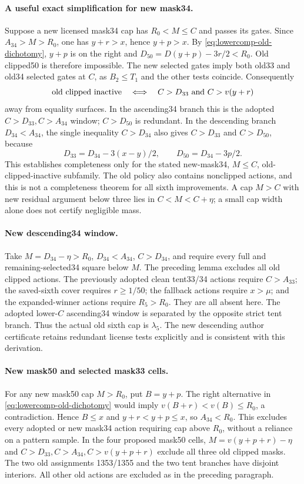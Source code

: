 \paragraph{A useful exact simplification for new mask34.}
Suppose a new licensed mask34 cap has $R_0<M\le C$ and passes its gates.
Since $A_{34}>M>R_0$, one has $y+r>x$, hence $y+p>x$.
By \eqref{eq:lowercomp-old-dichotomy}, $y+p$ is on the right and
$D_{50}=D(y+p)-3r/2<R_0$. Old clipped50 is therefore impossible.
The new selected gates imply both old33 and old34 selected gates at $C$,
as $B_2\le T_1$ and the other tests coincide. Consequently
\begin{equation}\label{eq:lowercomp-34-exact}
 \hbox{old clipped inactive}\quad\Longleftrightarrow\quad
 C>D_{33}\ \hbox{and}\ C>v(y+r)
\end{equation}
away from equality surfaces. In the ascending34 branch this is the
adopted $C>D_{33},C>A_{34}$ window; $C>D_{50}$ is redundant.
In the descending branch $D_{34}<A_{34}$, the single inequality
$C>D_{34}$ also gives $C>D_{33}$ and $C>D_{50}$, because
\[
 D_{33}=D_{34}-3(x-y)/2,\qquad D_{50}=D_{34}-3p/2.
\]
This establishes completeness only for the stated new-mask34,
$M\le C$, old-clipped-inactive subfamily. The old policy also contains
nonclipped actions, and this is not a completeness theorem for all sixth
improvements. A cap $M>C$ with new residual argument below three lies
in $C<M<C+\eta$; a small cap width alone does not certify negligible mass.

\paragraph{New descending34 window.}
Take $M=D_{34}-\eta>R_0$, $D_{34}<A_{34}$, $C>D_{34}$,
and require every full and remaining-selected34 square below $M$.
The preceding lemma excludes all old clipped actions. The previously
adopted clean tent33/34 actions require $C>A_{33}$; the saved-sixth cover
requires $r\ge1/50$; the fallback actions require $x>\mu$; and the
expanded-winner actions require $R_5>R_0$. They are all absent here.
The adopted lower-$C$ ascending34 window is separated by the opposite
strict tent branch. Thus the actual old sixth cap is $\lambda_5$.
The new descending author certificate retains redundant license tests
explicitly and is consistent with this derivation.

\paragraph{New mask50 and selected mask33 cells.}
For any new mask50 cap $M>R_0$, put $B=y+p$. The right alternative in
\eqref{eq:lowercomp-old-dichotomy} would imply
$v(B+r)<v(B)\le R_0$, a contradiction. Hence $B\le x$ and
$y+r<y+p\le x$, so $A_{34}<R_0$. This excludes every adopted or new
mask34 action requiring cap above $R_0$, without a reliance on a pattern
sample. In the four proposed mask50 cells, $M=v(y+p+r)-\eta$ and
$C>D_{33},C>A_{34},C>v(y+p+r)$ exclude all three old clipped masks.
The two old assignments 1353/1355 and the two tent branches have disjoint
interiors. All other old actions are excluded as in the preceding paragraph.

